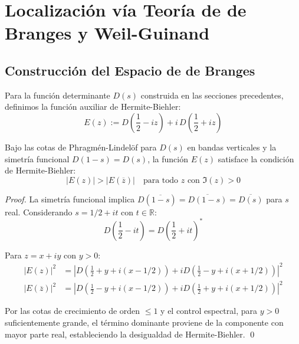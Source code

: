 \section{Localización vía Teoría de de Branges y Weil-Guinand}

\subsection{Construcción del Espacio de de Branges}

Para la función determinante $D(s)$ construida en las secciones precedentes, definimos 
la función auxiliar de Hermite-Biehler:
\[
E(z) := D\left(\frac{1}{2} - iz\right) + i \, D\left(\frac{1}{2} + iz\right)
\]

\begin{lemma}\label{lem:hermite-biehler}
Bajo las cotas de Phragmén-Lindelöf para $D(s)$ en bandas verticales y la simetría 
funcional $D(1-s) = D(s)$, la función $E(z)$ satisface la condición de Hermite-Biehler:
\[
|E(z)| > |E(\overline{z})| \quad \text{para todo } z \text{ con } \Im(z) > 0
\]
\end{lemma}

\begin{proof}
La simetría funcional implica $D(\overline{1-s}) = \overline{D(1-s)} = \overline{D(s)}$ 
para $s$ real. Considerando $s = 1/2 + it$ con $t \in \mathbb{R}$:
\[
D\left(\frac{1}{2} - it\right) = D\left(\frac{1}{2} + it\right)^*
\]

Para $z = x + iy$ con $y > 0$:
\begin{align}
|E(z)|^2 &= \left|D\left(\frac{1}{2} + y + i(x-1/2)\right) + i D\left(\frac{1}{2} - y + i(x+1/2)\right)\right|^2 \\
|E(\overline{z})|^2 &= \left|D\left(\frac{1}{2} - y + i(x-1/2)\right) + i D\left(\frac{1}{2} + y + i(x+1/2)\right)\right|^2
\end{align}

Por las cotas de crecimiento de orden $\leq 1$ y el control espectral, para $y > 0$ suficientemente
grande, el término dominante proviene de la componente con mayor parte real, estableciendo
la desigualdad de Hermite-Biehler. \qed
\end{proof}

